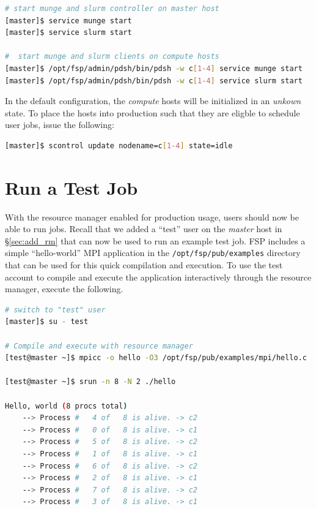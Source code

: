 \documentclass[letterpaper]{article}
\begin{document}
\begin{lstlisting}[language=bash]
# start munge and slurm controller on master host
[master]$ service munge start
[master]$ service slurm start

#  start munge and slurm clients on compute hosts
[master]$ /opt/fsp/admin/pdsh/bin/pdsh -w c[1-4] service munge start
[master]$ /opt/fsp/admin/pdsh/bin/pdsh -w c[1-4] service slurm start
\end{lstlisting}

In the default configuration, the {\em compute} hosts will be initialized in an
{\em unkown} state. To place the hosts into production such that they are
eligble to schedule user jobs, issue the following:


\begin{lstlisting}[language=bash]
[master]$ scontrol update nodename=c[1-4] state=idle
\end{lstlisting}


\section{Run a Test Job}

With the resource manager enabled for production usage, users should now be
able to run jobs. 
Recall that we added a ``test'' user on the {\em master} host in
\S\ref{sec:add_rm} that can now be used to run an example test job.  FSP
includes a simple ``hello-world'' MPI application in the
\texttt{/opt/fsp/pub/examples} directory that can be used for this quick
compilation and execution.  To use the test account to compile and execute the 
application interactively through the resource manager, execute the following.

\begin{lstlisting}[language=bash,keywords={}]
# switch to "test" user
[master]$ su - test

# Compile and execute with resource manager
[test@master ~]$ mpicc -o hello -O3 /opt/fsp/pub/examples/mpi/hello.c

[test@master ~]$ srun -n 8 -N 2 ./hello

Hello, world (8 procs total)
    --> Process #   4 of   8 is alive. -> c2
    --> Process #   0 of   8 is alive. -> c1
    --> Process #   5 of   8 is alive. -> c2
    --> Process #   1 of   8 is alive. -> c1
    --> Process #   6 of   8 is alive. -> c2
    --> Process #   2 of   8 is alive. -> c1
    --> Process #   7 of   8 is alive. -> c2
    --> Process #   3 of   8 is alive. -> c1
\end{lstlisting}
\end{document}
